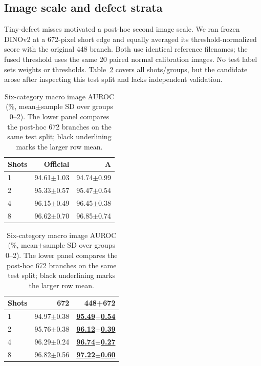 \documentclass[times,10pt,twocolumn,letterpaper]{article}
\newcommand{\bestscore}[1]{\underline{\textbf{#1}}}
\begin{document}
\subsection{Image scale and defect strata}
Tiny-defect misses motivated a post-hoc second image scale. We ran frozen DINOv2 at a 672-pixel short edge and equally averaged its threshold-normalized score with the original 448 branch. Both use identical reference filenames; the fused threshold uses the same 20 paired normal calibration images. No test label sets weights or thresholds. Table~\ref{tab:multiscale} covers all shots/groups, but the candidate arose after inspecting this test split and lacks independent validation.

\begin{table}[t]
\centering
\caption{Six-category macro image AUROC (\%, mean$\pm$sample SD over groups 0--2). The lower panel compares the post-hoc 672 branches on the same test split; black underlining marks the larger row mean.}
\label{tab:multiscale}
\scriptsize
\setlength{\tabcolsep}{3pt}
\begin{tabular}{lrr}
\toprule
Shots & Official & A\\
\midrule
1 & 94.61$\pm$1.03 & 94.74$\pm$0.99\\
2 & 95.33$\pm$0.57 & 95.47$\pm$0.54\\
4 & 96.15$\pm$0.49 & 96.45$\pm$0.38\\
8 & 96.62$\pm$0.70 & 96.85$\pm$0.74\\
\bottomrule
\end{tabular}\par\vspace{3pt}
\begin{tabular}{lrr}
\toprule
Shots & 672 & 448+672\\
\midrule
1 & 94.97$\pm$0.38 & \bestscore{95.49$\pm$0.54}\\
2 & 95.76$\pm$0.38 & \bestscore{96.12$\pm$0.39}\\
4 & 96.29$\pm$0.24 & \bestscore{96.74$\pm$0.27}\\
8 & 96.82$\pm$0.56 & \bestscore{97.22$\pm$0.60}\\
\bottomrule
\end{tabular}
\end{table}
\end{document}
